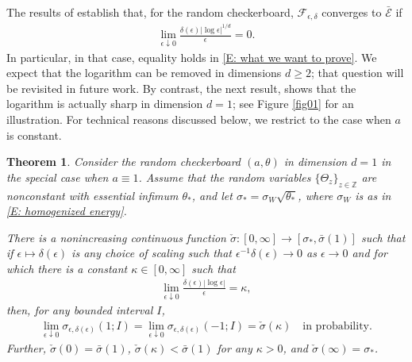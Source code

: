 \documentclass[10pt,a4paper]{amsart}
\newtheorem{theorem}{Theorem}
\begin{document}
The results of \cite[Theorem 1 \& Sections 4.6--4.7]{part1} establish that, for the random checkerboard, $\mathscr{F}_{\epsilon,\delta}$ converges to $\bar{\mathscr{E}}$ if 
	\begin{align}\label{E: assumption homogenization regime}
		\lim_{ \epsilon \downarrow 0 } \frac{ \delta ( \epsilon ) | \log \epsilon |^{1/d} }{ \epsilon } = 0.
	\end{align}
In particular, in that case, equality holds in \eqref{E: what we want to prove}. We expect that the logarithm can be removed in dimensions $d \geq 2$; that question will be revisited in future work. By contrast, the next result,  shows that the logarithm is actually sharp in dimension $d = 1$; see Figure \ref{fig01} for an illustration.  For technical reasons discussed below, we restrict to the case when $a$ is constant.

	\begin{theorem} \label{T: main deviations} Consider the random checkerboard $(a,\theta)$ in dimension $d = 1$ in the special case when $a \equiv 1$.  Assume that the random variables $\{\Theta_{z}\}_{z \in \mathbb{Z} }$ are nonconstant with essential infimum $\theta_{*}$, and let $\sigma_{*} = \sigma_{W} \sqrt{ \theta_{*} }$, where $\sigma_{W}$ is as in \eqref{E: homogenized energy}.  
    
    There is a nonincreasing continuous function $\check{\sigma} : [0,\infty] \to [\sigma_{*},\bar{\sigma}(1)]$ such that if $\epsilon \mapsto \delta(\epsilon)$ is any choice of scaling such that $\epsilon^{-1} \delta(\epsilon) \to 0$ as $\epsilon \to 0$ and for which there is a constant $\kappa \in [0,\infty]$ such that 
		\begin{align} \label{E: log condition}
			\lim_{\epsilon \downarrow 0} \frac{ \delta(\epsilon) | \log \epsilon | }{ \epsilon } = \kappa,
		\end{align}
	then, for any bounded interval $I$,
		\begin{align*}
			\lim_{\epsilon \downarrow 0} \sigma_{\epsilon,\delta(\epsilon)}(1; I ) = \lim_{ \epsilon \downarrow 0 } \sigma_{\epsilon,\delta(\epsilon)} (-1; I ) = \check{\sigma}(\kappa) \quad \text{in probability.}
		\end{align*}
    Further, $\check{\sigma}(0) = \bar{\sigma}(1)$, $\check{\sigma}(\kappa) < \bar{\sigma}(1)$ for any $\kappa > 0$, and $\check{\sigma}(\infty) = \sigma_{*}$. 
	\end{theorem}
\end{document}
